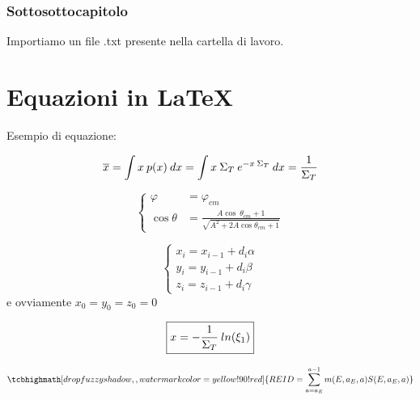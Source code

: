 \documentclass[preprint, twocolumn, 5p, lefttitle]{elsarticle} %
\begin{document}
\subsubsection{Sottosottocapitolo}
Importiamo un file .txt presente nella cartella di lavoro.


\section{Equazioni in \LaTeX}
Esempio di equazione:

\begin{equation}
\overline{x} = \int x \> p(x) \> dx  =  \int x \> \Sigma_T \> e^{-x \> \Sigma_T} \> dx = {1\over{\Sigma_T}}
\end{equation}

\medskip

\begin{equation}
\begin{cases} \varphi &=  \varphi_{cm} \\
\cos\theta &= \frac{A\cos\> \theta_{cm} + 1}{\sqrt{A^{2} + 2A\cos\theta_{cm} + 1}}
\end{cases}
\end{equation}

\medskip

\begin{equation}
\begin{cases}
x_i = x_{i-1} + d_i\alpha\\
y_i = y_{i-1} + d_i\beta\\
z_i = z_{i-1} + d_i\gamma
\end{cases}
\end{equation}
e ovviamente $x_0 = y_0 = z_0 = 0$

\medskip

\begin{equation}
\boxed{
 x = - {1\over{\Sigma_T}} \> ln (\xi_{1})
 }
\end{equation}

\medskip

\begin{equation*}
\tcbhighmath[drop fuzzy shadow, ,watermark color=yellow!90!red]{
REID = \sum\limits_{a=a_{E}}^{a-1} m(E,a_{E},a) S(E,a_{E},a) }
\end{equation*}


\end{document}
